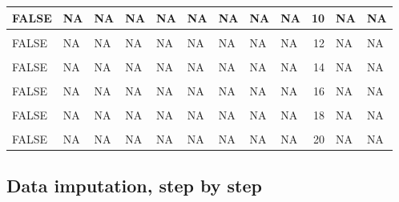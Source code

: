\documentclass[]{article}
\begin{document}
\begin{table}[H]
\begin{tabular}[t]{l|l|l|l|l|l|l|l|l|r|l|l}
\hline
FALSE & NA & NA & NA & NA & NA & NA & NA & NA & 10 & NA & NA\\
\hline
\cellcolor{gray!6}{FALSE} & \cellcolor{gray!6}{NA} & \cellcolor{gray!6}{NA} & \cellcolor{gray!6}{NA} & \cellcolor{gray!6}{NA} & \cellcolor{gray!6}{NA} & \cellcolor{gray!6}{NA} & \cellcolor{gray!6}{NA} & \cellcolor{gray!6}{NA} & \cellcolor{gray!6}{11} & \cellcolor{gray!6}{NA} & \cellcolor{gray!6}{NA}\\
\hline
FALSE & NA & NA & NA & NA & NA & NA & NA & NA & 12 & NA & NA\\
\hline
\cellcolor{gray!6}{FALSE} & \cellcolor{gray!6}{NA} & \cellcolor{gray!6}{NA} & \cellcolor{gray!6}{NA} & \cellcolor{gray!6}{NA} & \cellcolor{gray!6}{NA} & \cellcolor{gray!6}{NA} & \cellcolor{gray!6}{NA} & \cellcolor{gray!6}{NA} & \cellcolor{gray!6}{13} & \cellcolor{gray!6}{NA} & \cellcolor{gray!6}{NA}\\
\hline
FALSE & NA & NA & NA & NA & NA & NA & NA & NA & 14 & NA & NA\\
\hline
\cellcolor{gray!6}{FALSE} & \cellcolor{gray!6}{NA} & \cellcolor{gray!6}{NA} & \cellcolor{gray!6}{NA} & \cellcolor{gray!6}{NA} & \cellcolor{gray!6}{NA} & \cellcolor{gray!6}{NA} & \cellcolor{gray!6}{NA} & \cellcolor{gray!6}{NA} & \cellcolor{gray!6}{15} & \cellcolor{gray!6}{NA} & \cellcolor{gray!6}{NA}\\
\hline
FALSE & NA & NA & NA & NA & NA & NA & NA & NA & 16 & NA & NA\\
\hline
\cellcolor{gray!6}{FALSE} & \cellcolor{gray!6}{NA} & \cellcolor{gray!6}{NA} & \cellcolor{gray!6}{NA} & \cellcolor{gray!6}{NA} & \cellcolor{gray!6}{NA} & \cellcolor{gray!6}{NA} & \cellcolor{gray!6}{NA} & \cellcolor{gray!6}{NA} & \cellcolor{gray!6}{17} & \cellcolor{gray!6}{NA} & \cellcolor{gray!6}{NA}\\
\hline
FALSE & NA & NA & NA & NA & NA & NA & NA & NA & 18 & NA & NA\\
\hline
\cellcolor{gray!6}{FALSE} & \cellcolor{gray!6}{NA} & \cellcolor{gray!6}{NA} & \cellcolor{gray!6}{NA} & \cellcolor{gray!6}{NA} & \cellcolor{gray!6}{NA} & \cellcolor{gray!6}{NA} & \cellcolor{gray!6}{NA} & \cellcolor{gray!6}{NA} & \cellcolor{gray!6}{19} & \cellcolor{gray!6}{NA} & \cellcolor{gray!6}{NA}\\
\hline
FALSE & NA & NA & NA & NA & NA & NA & NA & NA & 20 & NA & NA\\
\hline
\end{tabular}
\end{table}

\hypertarget{data-imputation-step-by-step}{%
\subsection{Data imputation, step by
step}\label{data-imputation-step-by-step}}
\end{document}
